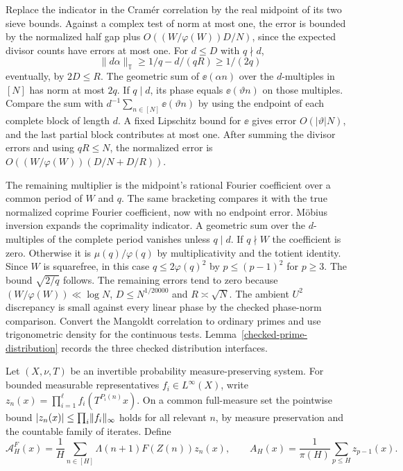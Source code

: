 Replace the indicator in the Cram\'er correlation by the real
midpoint of its two sieve bounds. Against a complex test of norm
at most one, the error is bounded by the normalized half gap plus
$O((W/\varphi(W))D/N)$, since the expected divisor counts have
errors at most one. For $d\le D$ with $q\nmid d$,
\[
 \|d\alpha\|_{\mathbb T}\ge 1/q-d/(qR)\ge 1/(2q)
\]
eventually, by $2D\le R$. The geometric sum of $\ee(\alpha n)$
over the $d$-multiples in $[N]$ has norm at most $2q$. If $q\mid d$,
its phase equals $\ee(\vartheta n)$ on those multiples. Compare
the sum with $d^{-1}\sum_{n\in[N]}\ee(\vartheta n)$ by using the
endpoint of each complete block of length $d$. A fixed Lipschitz
bound for $\ee$ gives error $O(|\vartheta|N)$, and the last partial
block contributes at most one. After summing the divisor errors
and using $qR\le N$, the normalized error is
$O((W/\varphi(W))(D/N+D/R))$.

The remaining multiplier is the midpoint's rational Fourier
coefficient over a common period of $W$ and $q$. The same
bracketing compares it with the true normalized coprime Fourier
coefficient, now with no endpoint error. M\"obius inversion expands
the coprimality indicator. A geometric sum over the $d$-multiples
of the complete period vanishes unless $q\mid d$. If $q\nmid W$
the coefficient is zero. Otherwise it is $\mu(q)/\varphi(q)$ by
multiplicativity and the totient identity. Since $W$ is squarefree,
in this case $q\le2\varphi(q)^2$ by $p\le(p-1)^2$ for $p\ge3$.
The bound $\sqrt{2/q}$ follows. The remaining errors tend to zero
because $(W/\varphi(W))\ll\log N$, $D\le N^{1/20000}$ and
$R\asymp\sqrt N$. The ambient $U^2$ discrepancy is small against
every linear phase by the checked phase-norm comparison. Convert
the Mangoldt correlation to ordinary primes and use trigonometric
density for the continuous tests. Lemma~\ref{checked-prime-distribution}
records the three checked distribution interfaces.

Let $(X,\nu,T)$ be an invertible probability
measure-preserving system. For bounded measurable representatives
$f_i\in L^\infty(X)$, write $z_n(x)=\prod_{i=1}^\ell f_i(T^{P_i(n)}x)$.
On a common full-measure set the pointwise bound
$|z_n(x)|\le\prod_i\lVert f_i\rVert_\infty$ holds for all relevant $n$,
by measure preservation and the countable family of iterates.
Define
\[
 \mathcal A_H^F(x)=\frac1H\sum_{n\in[H]}
       \Lambda(n+1)F(Z(n))z_n(x),\qquad
 A_H(x)=\frac1{\pi(H)}\sum_{p\le H}z_{p-1}(x).
\]

